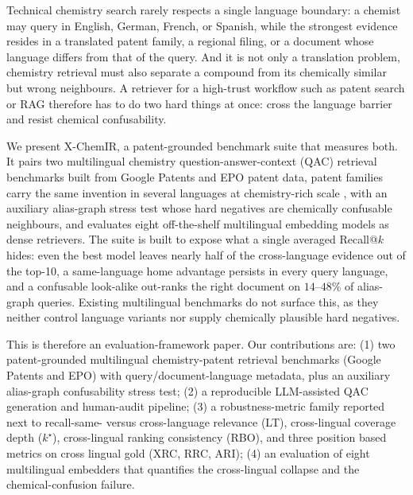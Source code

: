 
Technical chemistry search rarely respects a single language boundary: a chemist may query in English, German, French, or Spanish, while the strongest evidence resides in a translated patent family, a regional filing, or a document whose language differs from that of the query. And it is not only a translation
problem, chemistry retrieval must also separate a compound from its chemically similar
but wrong neighbours. A retriever for a high-trust workflow such as patent search or
RAG therefore has to do two hard things at once: cross the language barrier and resist
chemical confusability.

We present X-ChemIR, a patent-grounded benchmark suite that measures both. It pairs two
multilingual chemistry question-answer-context (QAC) retrieval benchmarks built from
Google Patents and EPO patent data, patent families carry the same invention in
several languages at chemistry-rich scale \citep{clefip2013}, with an auxiliary
alias-graph stress test whose hard negatives are chemically confusable neighbours, and
evaluates eight off-the-shelf multilingual embedding models as dense retrievers. The
suite is built to expose what a single averaged Recall@$k$ hides: even the best model
leaves nearly half of the cross-language evidence out of the top-10, a same-language
home advantage persists in every query language, and a confusable look-alike out-ranks
the right document on $14$--$48\%$ of alias-graph queries. Existing multilingual
benchmarks do not surface this, as they neither control language variants nor supply
chemically plausible hard negatives.

This is therefore an evaluation-framework paper. Our
contributions are: (1) two patent-grounded multilingual chemistry-patent retrieval
benchmarks (Google Patents and EPO) with query/document-language metadata, plus an
auxiliary alias-graph confusability stress test; (2) a reproducible LLM-assisted QAC
generation and human-audit pipeline; (3) a robustness-metric family reported next to
recall-same- versus cross-language relevance (LT), cross-lingual coverage depth
($k^\star$), cross-lingual ranking consistency (RBO), and three position based metrics on cross lingual gold (XRC, RRC, ARI); (4) an evaluation of eight multilingual embedders that
quantifies the cross-lingual collapse and the chemical-confusion failure.